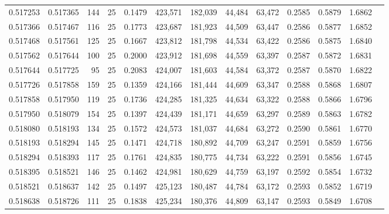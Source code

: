 \begin{tabular}{rrrrrrrrrrrrr}
0.517253 & 0.517365 &   144 &  25 &                                     0.1479 & 423,571 & 182,039 &  44,484 &  63,472 & 0.2585 & 0.5879 & 1.6862 \\
0.517366 & 0.517467 &   116 &  25 &                                     0.1773 & 423,687 & 181,923 &  44,509 &  63,447 & 0.2586 & 0.5877 & 1.6852 \\
0.517468 & 0.517561 &   125 &  25 &                                     0.1667 & 423,812 & 181,798 &  44,534 &  63,422 & 0.2586 & 0.5875 & 1.6840 \\
0.517562 & 0.517644 &   100 &  25 &                                     0.2000 & 423,912 & 181,698 &  44,559 &  63,397 & 0.2587 & 0.5872 & 1.6831 \\
0.517644 & 0.517725 &    95 &  25 &                                     0.2083 & 424,007 & 181,603 &  44,584 &  63,372 & 0.2587 & 0.5870 & 1.6822 \\
0.517726 & 0.517858 &   159 &  25 &                                     0.1359 & 424,166 & 181,444 &  44,609 &  63,347 & 0.2588 & 0.5868 & 1.6807 \\
0.517858 & 0.517950 &   119 &  25 &                                     0.1736 & 424,285 & 181,325 &  44,634 &  63,322 & 0.2588 & 0.5866 & 1.6796 \\
0.517950 & 0.518079 &   154 &  25 &                                     0.1397 & 424,439 & 181,171 &  44,659 &  63,297 & 0.2589 & 0.5863 & 1.6782 \\
0.518080 & 0.518193 &   134 &  25 &                                     0.1572 & 424,573 & 181,037 &  44,684 &  63,272 & 0.2590 & 0.5861 & 1.6770 \\
0.518193 & 0.518294 &   145 &  25 &                                     0.1471 & 424,718 & 180,892 &  44,709 &  63,247 & 0.2591 & 0.5859 & 1.6756 \\
0.518294 & 0.518393 &   117 &  25 &                                     0.1761 & 424,835 & 180,775 &  44,734 &  63,222 & 0.2591 & 0.5856 & 1.6745 \\
0.518395 & 0.518521 &   146 &  25 &                                     0.1462 & 424,981 & 180,629 &  44,759 &  63,197 & 0.2592 & 0.5854 & 1.6732 \\
0.518521 & 0.518637 &   142 &  25 &                                     0.1497 & 425,123 & 180,487 &  44,784 &  63,172 & 0.2593 & 0.5852 & 1.6719 \\
0.518638 & 0.518726 &   111 &  25 &                                     0.1838 & 425,234 & 180,376 &  44,809 &  63,147 & 0.2593 & 0.5849 & 1.6708 \\

\end{tabular}
